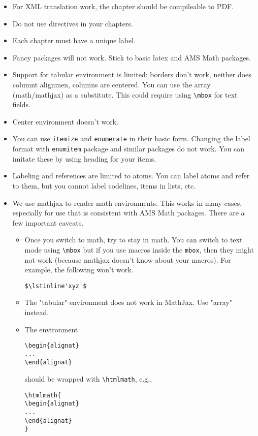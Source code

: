 \begin{itemize}

\item For XML translation work, the chapter should be compileable to PDF.

\item Do not use \lstinline`` directives in your chapters.

\item Each chapter must have a unique label.

\item Fancy packages will not work.  Stick to basic latex and AMS Math packages.

\item Support for tabular environment is limited: borders don't work, neither does columnt alignmen, columns are centered.  You can use the array (math/mathjax) as a substitute.  This could require using \lstinline`\mbox` for text fields.  
 
\item Center environment doesn't work.

\item You can use \lstinline`itemize` and \lstinline`enumerate` in their basic form.  Changing the label format with \lstinline`enumitem` package and similar packages do not work.  You can imitate these by using heading for your items.  

\item Labeling and references are limited to atoms.  You can label atoms and refer to them, but you cannot label codelines, items in lists, etc.

\item We use mathjax to render math environments.  This works in many cases, especially for use that is consistent with AMS Math packages.  There are a few important caveats. 

\begin{itemize}
\item Once you switch to math, try to stay in math.  You can switch to text mode using \lstinline`\mbox` but if you use macros inside  the \lstinline`mbox`, then they might not work (because mathjax doesn't know about your macros).  For example, the following won't work. 
\begin{lstlisting}
$\lstinline'xyz'$
\end{lstlisting}

\item The "tabular" environment does not work in MathJax.  Use "array" instead.

\item  The environment 
\begin{lstlisting}
\begin{alignat} 
... 
\end{alignat}
\end{lstlisting}
%
should be wrapped with \lstinline`\htmlmath`, e.g.,
%
\begin{lstlisting}
\htmlmath{
\begin{alignat} 
... 
\end{alignat}
}
\end{lstlisting} 
\end{itemize}
\end{itemize}

